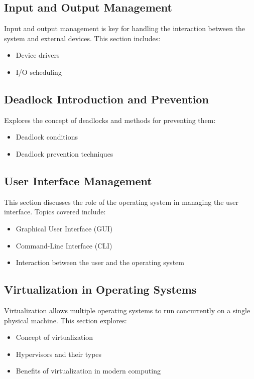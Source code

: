 \documentclass[12pt]{article}
\begin{document}
\subsection{Input and Output Management}
Input and output management is key for handling the interaction between the system and external devices. This section includes:
\begin{itemize}
    \item Device drivers
    \item I/O scheduling
\end{itemize}

\subsection{Deadlock Introduction and Prevention}
Explores the concept of deadlocks and methods for preventing them:
\begin{itemize}
    \item Deadlock conditions
    \item Deadlock prevention techniques
\end{itemize}

\subsection{User Interface Management}
This section discusses the role of the operating system in managing the user interface. Topics covered include:
\begin{itemize}
    \item Graphical User Interface (GUI)
    \item Command-Line Interface (CLI)
    \item Interaction between the user and the operating system
\end{itemize}

\subsection{Virtualization in Operating Systems}
Virtualization allows multiple operating systems to run concurrently on a single physical machine. This section explores:
\begin{itemize}
    \item Concept of virtualization
    \item Hypervisors and their types
    \item Benefits of virtualization in modern computing
\end{itemize}
\end{document}
